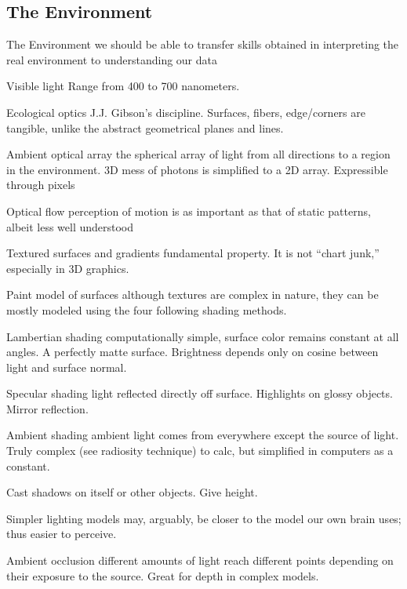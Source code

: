 \begin{mdframed}
\begin{multicols}{2}
\subsection{The Environment}
\begin{compactdesc}
\item[The Environment] we should be able to transfer skills obtained in
    interpreting the real environment to understanding our data
\item[Visible light] Range from 400 to 700 nanometers.
\item[Ecological optics] J.J. Gibson's discipline. Surfaces, fibers,
    edge/corners are tangible, unlike the abstract geometrical planes and
    lines.
\item[Ambient optical array] the spherical array of light from all directions
    to a region in the environment. 3D mess of photons is simplified to a 2D
    array. Expressible through pixels
\item[Optical flow] perception of motion is as important as that of static
    patterns, albeit less well understood
\item[Textured surfaces and gradients] fundamental property. It is not
    ``chart junk,'' especially in 3D graphics.
\item[Paint model of surfaces] although textures are complex in nature, they
    can be mostly modeled using the four following shading methods.
\item[Lambertian shading] computationally simple, surface color remains constant
    at all angles. A perfectly matte surface. Brightness depends only on cosine
    between light and surface normal.
\item[Specular shading] light reflected directly off surface. Highlights on
    glossy objects. Mirror reflection.
\item[Ambient shading] ambient light comes from everywhere except the source of
    light. Truly complex (see radiosity technique) to calc, but simplified
    in computers as a constant.
\item[Cast shadows] on itself or other objects. Give height.
\item[Simpler lighting] models may, arguably, be closer to the model our own
    brain uses; thus easier to perceive.
\item[Ambient occlusion] different amounts of light reach different points
    depending on their exposure to the source. Great for depth in complex
    models.

\end{compactdesc}
\end{multicols}\end{mdframed}

